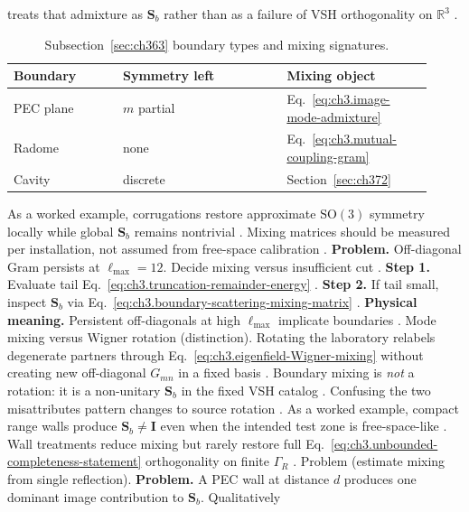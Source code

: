 treats that admixture as \(\mathbf{S}_{b}\) rather than as a failure of VSH orthogonality on \(\mathbb{R}^{3}\)
\cite{hansen1988}.
\begin{table}[t]
\centering
\caption{Subsection~\ref{sec:ch363} boundary types and mixing signatures.}
\label{tab:ch3.363-boundary-types}
\small
\begin{tabular}{@{}p{0.24\linewidth}p{0.36\linewidth}p{0.32\linewidth}@{}}
\toprule
Boundary & Symmetry left & Mixing object \\
\midrule
PEC plane & \(m\) partial & Eq.~\eqref{eq:ch3.image-mode-admixture} \\
Radome & none & Eq.~\eqref{eq:ch3.mutual-coupling-gram} \\
Cavity & discrete & Section~\ref{sec:ch372} \\
\bottomrule
\end{tabular}
\end{table}
As a worked example, corrugations restore approximate \(\mathrm{SO}(3)\) symmetry locally while global \(\mathbf{S}_{b}\) remains nontrivial
\cite{harrington2001}. Mixing matrices should be measured per installation, not assumed from free-space
calibration \cite{hansen1988}.
\textbf{Problem.} Off-diagonal Gram persists at \(\ell_{\max}=12\). Decide mixing versus insufficient cut
\cite{harrington2001}.
\textbf{Step 1.} Evaluate tail Eq.~\eqref{eq:ch3.truncation-remainder-energy} \cite{harrington2001}.
\textbf{Step 2.} If tail small, inspect \(\mathbf{S}_{b}\) via Eq.~\eqref{eq:ch3.boundary-scattering-mixing-matrix}
\cite{hansen1988}.
\textbf{Physical meaning.} Persistent off-diagonals at high \(\ell_{\max}\) implicate boundaries \cite{stratton1941}.
Mode mixing versus Wigner rotation (distinction). Rotating the laboratory relabels degenerate partners through Eq.~\eqref{eq:ch3.eigenfield-Wigner-mixing} without creating
new off-diagonal \(G_{mn}\) in a fixed basis \cite{jackson1999}. Boundary mixing is \emph{not} a rotation: it is
a non-unitary \(\mathbf{S}_{b}\) in the fixed VSH catalog \cite{harrington2001}. Confusing the two misattributes
pattern changes to source rotation \cite{harrington2001}.
As a worked example, compact range walls produce \(\mathbf{S}_{b}\neq\mathbf{I}\) even when the intended test zone is free-space-like
\cite{harrington2001}. Wall treatments reduce mixing but rarely restore full
Eq.~\eqref{eq:ch3.unbounded-completeness-statement} orthogonality on finite \(\Gamma_R\) \cite{hansen1988}.
Problem (estimate mixing from single reflection). \textbf{Problem.} A PEC wall at distance \(d\) produces one dominant image contribution to \(\mathbf{S}_{b}\). Qualitatively
